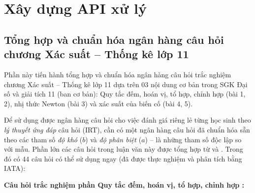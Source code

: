 \chapter{Xây dựng API xử lý}

\section{Tổng hợp và chuẩn hóa ngân hàng câu hỏi chương Xác suất – Thống kê lớp 11}
Phần này tiến hành tổng hợp và chuẩn hóa ngân hàng câu hỏi trắc nghiệm chương Xác suất – Thống kê lớp 11 dựa trên 03 nội dung cơ bản trong SGK Đại số và giải tích 11 (ban cơ bản): Quy tắc đếm, hoán vị, tổ hợp, chỉnh hợp (bài 1, 2), nhị thức Newton (bài 3) và xác suất của biến cố (bài 4, 5).\par
Để sử dụng được ngân hàng câu hỏi cho việc đánh giá riêng lẻ từng học sinh theo \textit{lý thuyết ứng đáp} câu hỏi (IRT), cần có một ngân hàng câu hỏi đã chuẩn hóa sẵn theo các tham số \textit{độ khó} ($b$) và \textit{độ phân biệt} ($a$) – là những tham số độc lập so với mẫu. Phần lớn các câu hỏi trong luận văn này được tổng hợp từ \cite{luyen2018xay} và \cite{truc2018xay}. Trong đó có 44 câu hỏi có thể sử dụng ngay (đã được thực nghiệm và phân tích bằng IATA):\par
\noindent\textbf{Câu hỏi trắc nghiệm phần Quy tắc đếm, hoán vị, tổ hợp, chỉnh hợp \cite{truc2018xay}:}\par
